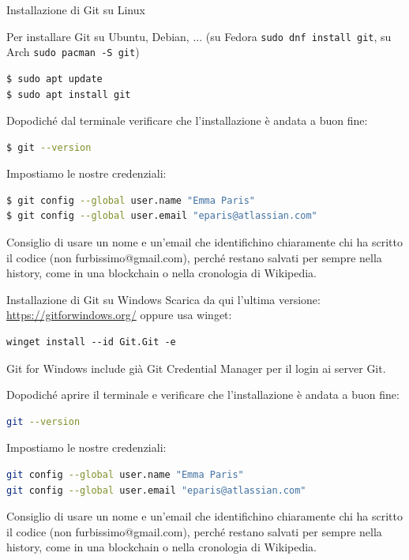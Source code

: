 \documentclass[aspectratio=169,handout,10pt]{beamer}
\begin{document}
\begin{frame}[fragile]{Installazione di Git su Linux}
    
    Per installare Git su Ubuntu, Debian, ... (su Fedora \lstinline{sudo dnf install git}, su Arch \lstinline{sudo pacman -S git})
    \begin{lstlisting}[language=bash]
$ sudo apt update
$ sudo apt install git\end{lstlisting}
    Dopodiché dal terminale verificare che l'installazione è andata a buon fine:
    \begin{lstlisting}[language=bash]
$ git --version\end{lstlisting}
    Impostiamo le nostre credenziali:
    \begin{lstlisting}[language=bash]
$ git config --global user.name "Emma Paris"
$ git config --global user.email "eparis@atlassian.com"\end{lstlisting}
    
    Consiglio di usare un nome e un'email che identifichino chiaramente chi ha scritto il codice (non furbissimo@gmail.com), perché restano salvati per sempre nella history, come in una blockchain o nella cronologia di Wikipedia.
\end{frame}
\begin{frame}[fragile]{Installazione di Git su Windows}
    Scarica da qui l'ultima versione: \url{https://gitforwindows.org/} oppure usa winget:
    \begin{lstlisting}
winget install --id Git.Git -e\end{lstlisting}
    Git for Windows include già Git Credential Manager per il login ai server Git.

    Dopodiché aprire il terminale e verificare che l'installazione è andata a buon fine:
    \begin{lstlisting}[language=bash]
git --version\end{lstlisting}
    Impostiamo le nostre credenziali:
    \begin{lstlisting}[language=bash]
git config --global user.name "Emma Paris"
git config --global user.email "eparis@atlassian.com"\end{lstlisting}
    
    Consiglio di usare un nome e un'email che identifichino chiaramente chi ha scritto il codice (non furbissimo@gmail.com), perché restano salvati per sempre nella history, come in una blockchain o nella cronologia di Wikipedia.
\end{frame}
\end{document}
